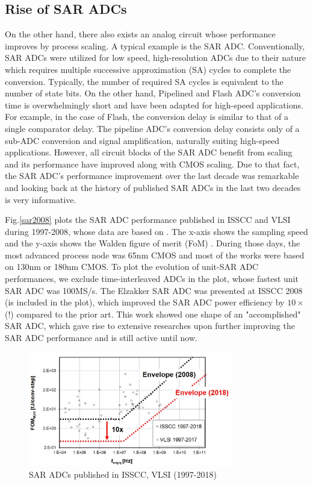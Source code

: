 \subsection{Rise of SAR ADCs}
On the other hand, there also exists an analog circuit whose performance improves by process scaling. 
A typical example is the SAR ADC.
Conventionally, SAR ADCs were utilized for low speed, high-resolution ADCs due to their nature which requires multiple successive approximation (SA) cycles to complete the conversion. 
Typically, the number of required SA cycles is equivalent to the number of state bits. 
On the other hand, Pipelined and Flash ADC's conversion time is overwhelmingly short and have been adapted for high-speed applications. 
For example, in the case of Flash, the conversion delay is similar to that of a single comparator delay. The pipeline ADC's conversion delay consists only of a sub-ADC conversion and signal amplification, naturally suiting high-speed applications. 
However, all circuit blocks of the SAR ADC benefit from scaling and its performance have improved along with CMOS scaling.
Due to that fact, the SAR ADC's performance improvement over the last decade was remarkable and looking back at the history of published SAR ADCs in the last two decades is very informative.

Fig.\ref{sar2008} plots the SAR ADC performance published in ISSCC and VLSI during 1997-2008, whose data are based on \cite{MurmanADC}.
The x-axis shows the sampling speed and the y-axis shows the Walden figure of merit (FoM) \cite{walden1999analog}.
During those days, the most advanced process node was 65nm CMOS and most of the works were based on 130nm or 180nm CMOS.
To plot the evolution of unit-SAR ADC performances, we exclude time-interleaved ADCs in the plot, whose fastest unit SAR ADC was 100MS/s.
The Elzakker SAR ADC \cite{elzakker} was presented at ISSCC 2008 (is included in the plot), which improved the SAR ADC power efficiency by $10\times$ (!) compared to the prior art. This work showed one shape of an "accomplished" SAR ADC, which gave rise to extensive researches upon further improving the SAR ADC performance and is still active until now.

\begin{figure}[!]
\centering
  \includegraphics[width=0.8\textwidth]{figure/chap1/sar-performance-2018.jpg}
  \caption{SAR ADCs published in ISSCC, VLSI (1997-2018)}
  \label{sar2018}
\end{figure}

